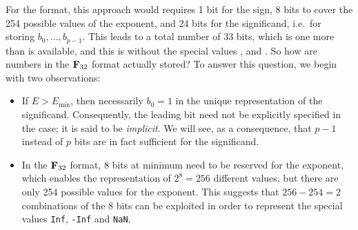 For the  format,
this approach would requires 1 bit for the sign,
8 bits to cover the 254 possible values of the exponent, and 24 bits for the significand,
i.e.\ for storing $b_0, \dots, b_{p-1}$.
This leads to a total number of 33 bits,
which is one more than is available,
and this is without the special values ,  and .
So how are numbers in the $\mathbf F_{32}$ format actually stored?
To answer this question,
we begin with two observations:
\begin{itemize}
    \item
        If $E > E_{\min}$,
        then necessarily $b_0 = 1$ in the unique representation of the significand.
        Consequently, the leading bit need not be explicitly specified in the case;
        it is said to be \emph{implicit}.
        We will see,
        as a consequence,
        that $p-1$ instead of $p$ bits are in fact sufficient for the significand.
    \item
        In the $\mathbf F_{32}$ format,
        8 bits at minimum need to be reserved for the exponent,
        which enables the representation of $2^8 = 256$ different values,
        but there are only 254 possible values for the exponent.
        This suggests that $256 - 254 = 2$ combinations of the 8 bits can be exploited in order to
        represent the special values \texttt{Inf}, \texttt{-Inf} and \texttt{NaN}.
\end{itemize}

